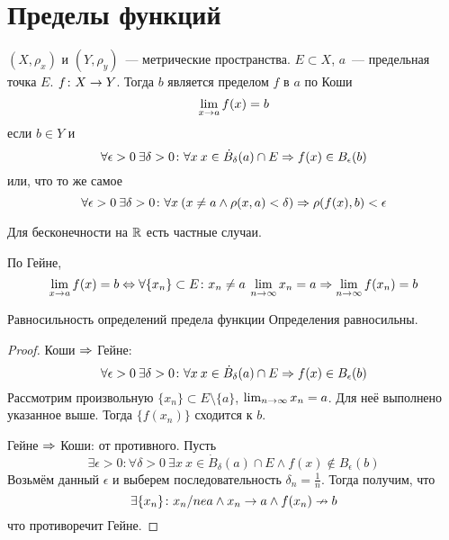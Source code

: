 \section{Пределы функций}

\begin{Def}
$(X, \rho_x)$ и $(Y, \rho_y)$~--- метрические пространства. $E \subset X$, $a$~--- предельная точка $E$. $f\colon X \rightarrow Y$.
Тогда $b$ является пределом $f$ в $a$ по Коши
$$\lim_{x \rightarrow a} f(x) = b$$
если $b \in Y$ и
$$\forall \epsilon>0\: \exists \delta > 0\colon \forall x\: x \in \dot B_\delta(a) \cap E \Rightarrow f(x) \in B_\epsilon (b)$$
или, что то же самое
$$\forall \epsilon>0\: \exists \delta > 0\colon \forall x\: (x \ne a \land \rho(x, a) < \delta) \Rightarrow \rho(f(x), b) < \epsilon$$
\end{Def}

\begin{Rem}
Для бесконечности на $\mathbb{R}$ есть частные случаи.
\end{Rem}

\begin{Def}
По Гейне,
$$\lim_{x \rightarrow a} f(x) = b \Leftrightarrow \forall \{x_n\}\subset E\colon x_n \ne a\: \lim_{n\rightarrow \infty} x_n = a \Rightarrow \lim_{n \rightarrow \infty} f(x_n) = b$$
\end{Def}

\begin{theorem}{Равносильность определений предела функции}
Определения равносильны.
\end{theorem}
\begin{proof}
Коши $\Rightarrow$ Гейне:
$$\forall \epsilon>0\: \exists \delta > 0\colon \forall x\: x \in \dot B_\delta(a) \cap E \Rightarrow f(x) \in B_\epsilon (b)$$
Рассмотрим произвольную $\{x_n\} \subset E \setminus \{a\}$, $\lim_{n\rightarrow\infty} x_n = a$. Для неё выполнено указанное выше. Тогда $\{f(x_n)\}$ сходится к $b$.

Гейне $\Rightarrow$ Коши: от противного. Пусть
$$\exists \epsilon>0\colon \forall \delta > 0\: \exists x\: x \in \dot B_\delta(a) \cap E \land f(x) \notin B_\epsilon(b)$$
Возьмём данный $\epsilon$ и выберем последовательность $\delta_n = \frac1n$. Тогда получим, что
$$\exists \{x_n\}\colon x_n /ne a \land x_n \rightarrow a \land f(x_n) \nrightarrow b$$
что противоречит Гейне.
\end{proof}